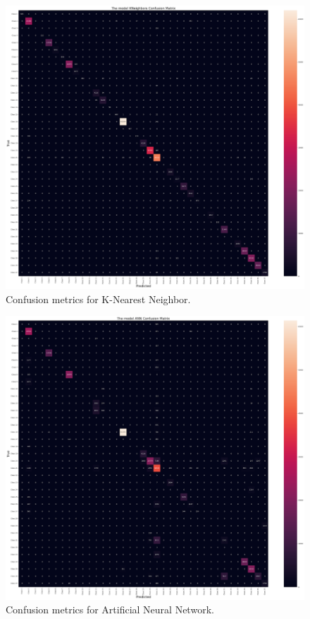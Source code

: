 \documentclass[conference,final,]{IEEEtran}
\begin{document}
\begin{figure}

{\centering \includegraphics[width=0.7\linewidth]{img/fig13} 

}

\caption{Confusion metrics for K-Nearest Neighbor.}\label{fig:unnamed-chunk-13}
\end{figure}

\begin{figure}

{\centering \includegraphics[width=0.7\linewidth]{img/ANN} 

}

\caption{Confusion metrics for Artificial Neural Network.}\label{fig:unnamed-chunk-13b}
\end{figure}
\end{document}
